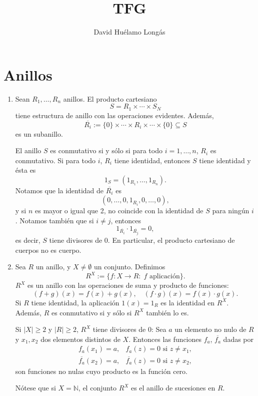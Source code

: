 \documentclass[11pt]{book}
\title{TFG}
\author{David Huélamo Longás}
\def\N{\mathbb{N}}
\theoremstyle{definition}
\begin{document}
\chapter{Anillos}
\begin{enumerate}
    \item Sean $R_1,\dots,R_n$ anillos. El producto cartesiano\[
    S=R_1\times\cdots\times S_N
    \]tiene estructura de anillo con las operaciones evidentes. Además,\[
    \overline{R_i}:=\{0\}\times\cdots\times R_i\times\cdots\times \{0\}\subseteq S
    \]es un subanillo.

    El anillo $S$ es conmutativo si y sólo si para todo $i=1,\dots, n$, $R_i$ es conmutativo. Si para todo $i$, $R_i$ tiene identidad, entonces $S$ tiene identidad y ésta es \[
    1_S=(1_{R_1},\dots,1_{R_n}).
    \]Notamos que la identidad de $\overline{R_i}$ es\[
    (0,\dots,0,1_{R_i},0,\dots,0),
    \]y si $n$ es mayor o igual que 2, no coincide con la identidad de $S$ para ningún $i$. Notamos también que si $i\neq j$, entonces\[
    1_{\overline{R_i}}\cdot 1_{\overline{R_j}}=0,
    \]es decir, $S$ tiene divisores de 0. En particular, el producto cartesiano de cuerpos no es cuerpo.

    \item Sea $R$ un anillo, y $X\neq \emptyset$ un conjunto. Definimos\[
    R^X:=\{f:X\longrightarrow R:\; f\text{ aplicación}\}.
    \]$R^X$ es un anillo con las operaciones de suma y producto de funciones:\[
    (f+g)(x)=f(x)+g(x),\quad (f\cdot g)(x)=f(x)\cdot g(x).
    \]Si $R$ tiene identidad, la aplicación $1(x)=1_R$ es la identidad en $R^X$. Además, $R$ es conmutativo si y sólo si $R^X$ también lo es.

    Si $|X|\geq 2$ y $|R|\geq 2$, $R^X$ tiene divisores de 0: Sea $a$ un elemento no nulo de $R$ y $x_1,x_2$ dos elementos distintos de $X$. Entonces las funciones $f_a$, $\overline{f_a}$ dadas por\[
    \begin{array}{ll}
        f_a(x_1)=a, & f_a(z)=0\text{ si }z\neq x_1,\\
        \overline{f_a}(x_2)=a, & \overline{f_a}(z)=0\text{ si }z\neq x_2,
    \end{array}
    \]son funciones no nulas cuyo producto es la función cero.

    Nótese que si $X=\N$, el conjunto $R^X$ es el anillo de sucesiones en $R$.


\end{enumerate}
\end{document}
